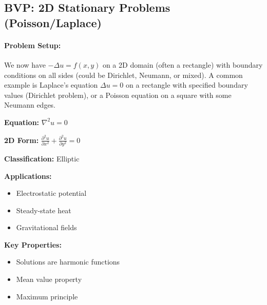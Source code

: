 \documentclass[a4paper,11pt]{report}
\begin{document}
\subsection{BVP: 2D Stationary Problems (Poisson/Laplace)}
\paragraph{Problem Setup:}
We now have $-\Delta u = f(x,y)$ on a 2D domain (often a rectangle) with boundary conditions on all sides (could be Dirichlet, Neumann, or mixed). A common example is Laplace’s equation $\Delta u = 0$ on a rectangle with specified boundary values (Dirichlet problem), or a Poisson equation on a square with some Neumann edges.
\begin{tcolorbox}[pde, elliptic, title=Laplace Equation]
\begin{multicols}{2}
\textbf{Equation:} $\nabla^2 u = 0$

\textbf{2D Form:} $\frac{\partial^2 u}{\partial x^2} + \frac{\partial^2 u}{\partial y^2} = 0$

\textbf{Classification:} Elliptic

\textbf{Applications:}
\begin{itemize}[leftmargin=*, nosep]
\item Electrostatic potential
\item Steady-state heat 
\item Gravitational fields
\end{itemize}

\textbf{Key Properties:}
\begin{itemize}[leftmargin=*, nosep]
\item Solutions are harmonic functions
\item Mean value property
\item Maximum principle
\end{itemize}
\columnbreak

\end{multicols}
\end{tcolorbox}
\end{document}
